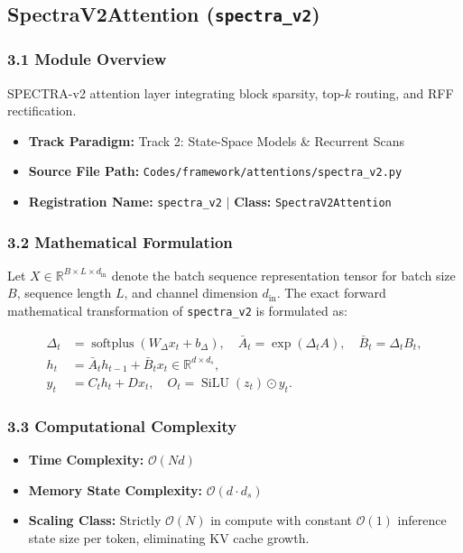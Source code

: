 \subsection{SpectraV2Attention (\texttt{spectra\_v2})}
\label{sec:app_module_spectra\_v2}

\subsubsection*{3.1 Module Overview}
SPECTRA-v2 attention layer integrating block sparsity, top-$k$ routing, and RFF rectification.
\begin{itemize}
    \item \textbf{Track Paradigm:} Track 2: State-Space Models & Recurrent Scans
    \item \textbf{Source File Path:} \texttt{Codes/framework/attentions/spectra\_v2.py}
    \item \textbf{Registration Name:} \texttt{spectra\_v2} $\mid$ \textbf{Class:} \texttt{SpectraV2Attention}
\end{itemize}

\subsubsection*{3.2 Mathematical Formulation}
Let $X \in \mathbb{R}^{B \times L \times d_{\text{in}}}$ denote the batch sequence representation tensor for batch size $B$, sequence length $L$, and channel dimension $d_{\text{in}}$. The exact forward mathematical transformation of \texttt{spectra\_v2} is formulated as:

\begin{align}
\Delta_t &= \operatorname{softplus}(W_\Delta x_t + b_\Delta), \quad \bar{A}_t = \exp(\Delta_t A), \quad \bar{B}_t = \Delta_t B_t, \\
h_t &= \bar{A}_t h_{t-1} + \bar{B}_t x_t \in \mathbb{R}^{d \times d_s}, \\
y_t &= C_t h_t + D x_t, \quad O_t = \operatorname{SiLU}(z_t) \odot y_t.
\end{align}


\subsubsection*{3.3 Computational Complexity}
\begin{itemize}
    \item \textbf{Time Complexity:} $\mathcal{O}(N d)$
    \item \textbf{Memory State Complexity:} $\mathcal{O}(d \cdot d_s)$
    \item \textbf{Scaling Class:} Strictly $\mathcal{O}(N)$ in compute with constant $\mathcal{O}(1)$ inference state size per token, eliminating KV cache growth.
\end{itemize}

